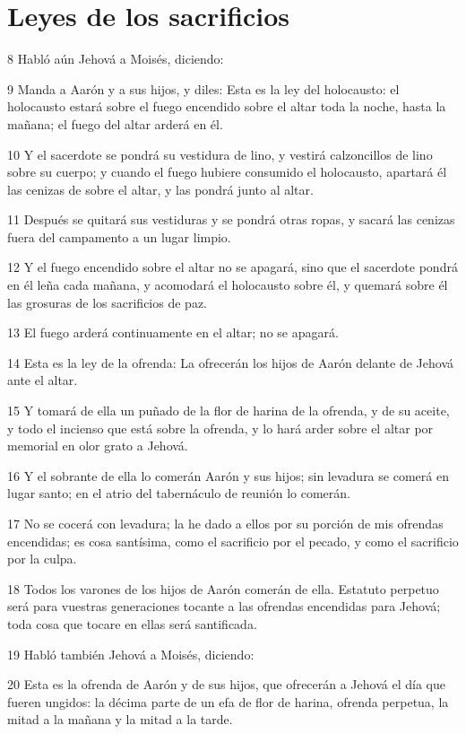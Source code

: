 \section*{Leyes de los sacrificios}

\par 8 Habló aún Jehová a Moisés, diciendo:
\par 9 Manda a Aarón y a sus hijos, y diles: Esta es la ley del holocausto: el holocausto estará sobre el fuego encendido sobre el altar toda la noche, hasta la mañana; el fuego del altar arderá en él.
\par 10 Y el sacerdote se pondrá su vestidura de lino, y vestirá calzoncillos de lino sobre su cuerpo; y cuando el fuego hubiere consumido el holocausto, apartará él las cenizas de sobre el altar, y las pondrá junto al altar.
\par 11 Después se quitará sus vestiduras y se pondrá otras ropas, y sacará las cenizas fuera del campamento a un lugar limpio.
\par 12 Y el fuego encendido sobre el altar no se apagará, sino que el sacerdote pondrá en él leña cada mañana, y acomodará el holocausto sobre él, y quemará sobre él las grosuras de los sacrificios de paz.
\par 13 El fuego arderá continuamente en el altar; no se apagará.
\par 14 Esta es la ley de la ofrenda: La ofrecerán los hijos de Aarón delante de Jehová ante el altar.
\par 15 Y tomará de ella un puñado de la flor de harina de la ofrenda, y de su aceite, y todo el incienso que está sobre la ofrenda, y lo hará arder sobre el altar por memorial en olor grato a Jehová.
\par 16 Y el sobrante de ella lo comerán Aarón y sus hijos; sin levadura se comerá en lugar santo; en el atrio del tabernáculo de reunión lo comerán.
\par 17 No se cocerá con levadura; la he dado a ellos por su porción de mis ofrendas encendidas; es cosa santísima, como el sacrificio por el pecado, y como el sacrificio por la culpa.
\par 18 Todos los varones de los hijos de Aarón comerán de ella. Estatuto perpetuo será para vuestras generaciones tocante a las ofrendas encendidas para Jehová; toda cosa que tocare en ellas será santificada.
\par 19 Habló también Jehová a Moisés, diciendo:
\par 20 Esta es la ofrenda de Aarón y de sus hijos, que ofrecerán a Jehová el día que fueren ungidos: la décima parte de un efa   de flor de harina, ofrenda perpetua, la mitad a la mañana y la mitad a la tarde.
